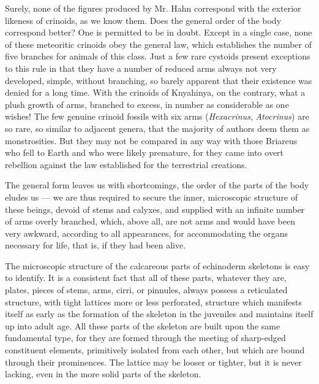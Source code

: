 \documentclass[a4paper, 12pt, oneside]{article}
\begin{document}
Surely, none of the figures produced by Mr. Hahn correspond with the exterior likeness of crinoids, as we know them. Does the general order of the body correspond better? One is permitted to be in doubt. Except in a single case, none of these meteoritic crinoids obey the general law, which establishes the number of five branches for animals of this class. Just a few rare cystoids present exceptions to this rule in that they have a number of reduced arms always not very developed, simple, without branching, so barely apparent that their existence was denied for a long time. With the crinoids of Knyahinya, on the contrary, what a plush growth of arms, branched to excess, in number as considerable as one wishes! The few genuine crinoid fossils with six arms (\emph{Hexacrinus}, \emph{Atocrinus}) are so rare, so similar to adjacent genera, that the majority of authors deem them as monstrosities. But they may not be compared in any way with those Briareus who fell to Earth and who were likely premature, for they came into overt rebellion against the law established for the terrestrial creations.

The general form leaves us with shortcomings, the order of the parts of the body eludes us --- we are thus required to secure the inner, microscopic structure of these beings, devoid of stems and calyxes, and supplied with an infinite number of arms overly branched, which, above all, are not arms and would have been very awkward, according to all appearances, for accommodating the organs necessary for life, that is, if they had been alive.

The microscopic structure of the calcareous parts of echinoderm skeletons is easy to identify. It is a consistent fact that all of these parts, whatever they are, plates, pieces of stems, arms, cirri, or pinnules, always possess a reticulated structure, with tight lattices more or less perforated, structure which manifests itself as early as the formation of the skeleton in the juveniles and maintains itself up into adult age. All these parts of the skeleton are built upon the same fundamental type, for they are formed through the meeting of sharp-edged constituent elements, primitively isolated from each other, but which are bound through their prominences. The lattice may be looser or tighter, but it is never lacking, even in the more solid parts of the skeleton.
\end{document}
